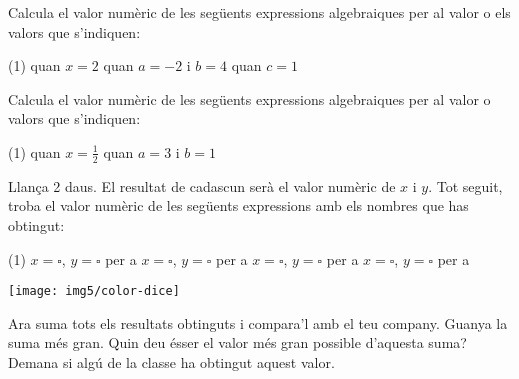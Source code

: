 \begin{mylist}
\answers{[$0$, $-1$, $-2$]}

\exer  Calcula el valor numèric de les següents expressions algebraiques per al valor o els valors que s'indiquen:
\begin{tasks}(1)
	\task  {}   quan   $ x = 2$   
	\task {}   quan    $a = -2$ i $\textit{b} = 4$   
	\task  {}   quan    $c = 1$
\end{tasks}

\answers{[$1$, $-1$, $11$]}

\exer  Calcula el valor numèric de les següents expressions algebraiques per al valor o valors que s'indiquen:
\begin{tasks}(1)
	\task  {}  quan  $x=\frac{1}{2}$   
	\task {}  quan $a=3 $ i $b=1$
\end{tasks}

\answers{[$\frac{9}{4}$, $9$]}

\vspace{-3.75cm}
\exer \begin{minipage}[t]{0.75\textwidth}
	\simbolsearch Llança 2 daus. El resultat de cadascun serà el valor numèric de $x$ i $y$. Tot seguit, troba el valor numèric de les següents expressions amb els nombres que has obtingut: \vspace{0.25cm}
	
	\begin{tasks}(1)
		\task $x=\square$, \qquad $y=\square$ \qquad per a       \vspace{0.25cm}
		\task $x=\square$, \qquad $y=\square$ \qquad per a    \vspace{0.25cm}
		\task $x=\square$, \qquad $y=\square$ \qquad per a     \vspace{0.25cm}
		\task $x=\square$, \qquad $y=\square$ \qquad per a    \vspace{0.25cm}
	\end{tasks}
\end{minipage}
\begin{minipage}{0.24\textwidth}
	\centering
	\vspace{4.5cm}
	\texttt{[image: img5/color-dice]}
\end{minipage}
Ara suma tots els resultats obtinguts i compara'l amb el teu company. Guanya la suma més gran. Quin deu ésser el valor més gran possible d'aquesta suma? Demana si algú de la classe ha obtingut aquest valor.
 
\end{mylist}

